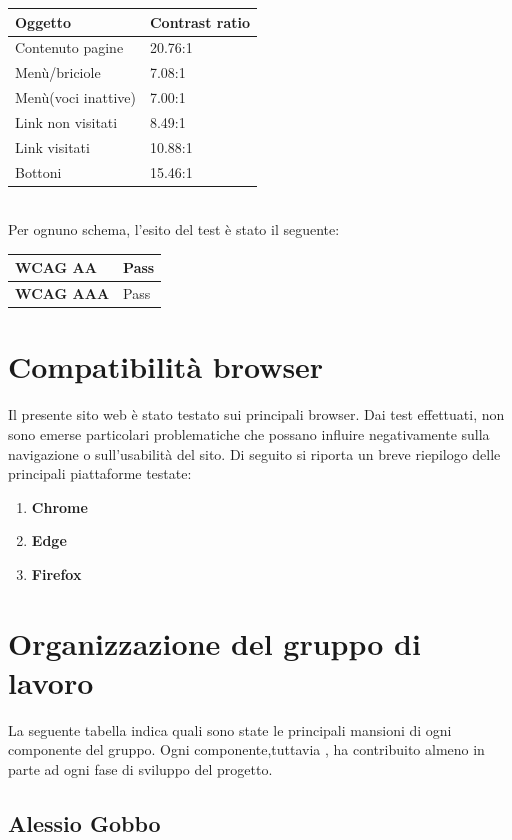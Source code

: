 \begin{tabular}{l|l}
	\hline
	 \textbf{Oggetto} & \textbf{Contrast ratio}  \\
	\hline
	  Contenuto pagine & 20.76:1  \\
	\hline
	Menù/briciole & 7.08:1 \\
	\hline
	Menù(voci inattive) & 7.00:1 \\
	\hline
	Link non visitati & 8.49:1 \\
	\hline
	Link visitati & 10.88:1 \\
	\hline
	Bottoni & 15.46:1 \\
\end{tabular}\\
Per ognuno schema, l'esito del test è stato il seguente:\\
\begin{tabular}{l|l}
	\hline
	 \textbf{WCAG AA} & Pass  \\
	\hline
	 \textbf{WCAG AAA} & Pass  \\
	\hline
\end{tabular}


\section{Compatibilità browser}

Il presente sito web è stato testato sui principali browser. Dai test effettuati, non sono emerse particolari problematiche che possano influire negativamente sulla navigazione o sull'usabilità del sito.
Di seguito si riporta un breve riepilogo delle principali piattaforme testate:
	\begin{enumerate}
		\item \textbf{Chrome}
		\item \textbf{Edge}
		\item \textbf{Firefox}
	\end{enumerate}

\section{Organizzazione del gruppo di lavoro}

La seguente tabella indica quali sono state le principali mansioni di ogni componente del gruppo. Ogni componente,tuttavia , ha contribuito almeno in parte ad ogni fase di sviluppo del progetto.

\subsection{Alessio Gobbo}

